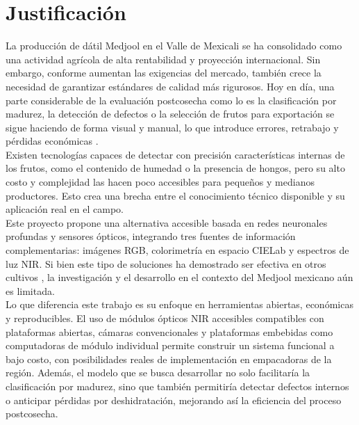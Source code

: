 \section{Justificación}

La producción de dátil Medjool en el Valle de Mexicali se ha consolidado como una actividad agrícola de alta rentabilidad y proyección internacional. Sin embargo, conforme aumentan las exigencias del mercado, también crece la necesidad de garantizar estándares de calidad más rigurosos. Hoy en día, una parte considerable de la evaluación postcosecha como lo es la clasificación por madurez, la detección de defectos o la selección de frutos para exportación se sigue haciendo de forma visual y manual, lo que introduce errores, retrabajo y pérdidas económicas \parencite{perez-perez_evaluation_2021}.\\

Existen tecnologías capaces de detectar con precisión características internas de los frutos, como el contenido de humedad o la presencia de hongos, pero su alto costo y complejidad las hacen poco accesibles para pequeños y medianos productores. Esto crea una brecha entre el conocimiento técnico disponible y su aplicación real en el campo.\\

Este proyecto propone una alternativa accesible basada en redes neuronales profundas y sensores ópticos, integrando tres fuentes de información complementarias: imágenes RGB, colorimetría en espacio CIELab y espectros de luz NIR. Si bien este tipo de soluciones ha demostrado ser efectiva en otros cultivos \parencite{chen_prediction_2024, wang_improving_2025}, la investigación y el desarrollo en el contexto del Medjool mexicano aún es limitada.\\

Lo que diferencia este trabajo es su enfoque en herramientas abiertas, económicas y reproducibles. El uso de módulos ópticos NIR accesibles compatibles con plataformas abiertas, cámaras convencionales y plataformas embebidas como computadoras de módulo individual permite construir un sistema funcional a bajo costo, con posibilidades reales de implementación en empacadoras de la región. Además, el modelo que se busca desarrollar no solo facilitaría la clasificación por madurez, sino que también permitiría detectar defectos internos o anticipar pérdidas por deshidratación, mejorando así la eficiencia del proceso postcosecha.